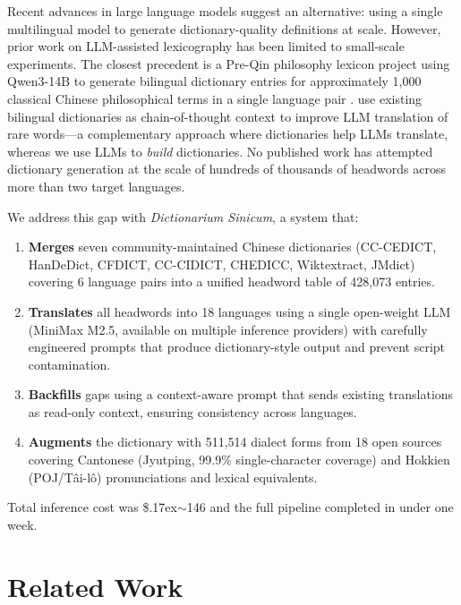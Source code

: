 \documentclass[11pt]{article}
\begin{document}
Recent advances in large language models suggest an alternative: using a single multilingual model to generate dictionary-quality definitions at scale. However, prior work on LLM-assisted lexicography has been limited to small-scale experiments. The closest precedent is a Pre-Qin philosophy lexicon project using Qwen3-14B to generate bilingual dictionary entries for approximately 1,000 classical Chinese philosophical terms in a single language pair \citep{wu2025preqin}. \citet{lu2024chainofdict} use existing bilingual dictionaries as chain-of-thought context to improve LLM translation of rare words---a complementary approach where dictionaries help LLMs translate, whereas we use LLMs to \textit{build} dictionaries. No published work has attempted dictionary generation at the scale of hundreds of thousands of headwords across more than two target languages.

We address this gap with \textit{Dictionarium Sinicum}, a system that:

\begin{enumerate}
\item \textbf{Merges} seven community-maintained Chinese dictionaries (CC-CEDICT, HanDeDict, CFDICT, CC-CIDICT, CHEDICC, Wiktextract, JMdict) covering 6 language pairs into a unified headword table of 428,073 entries.
\item \textbf{Translates} all headwords into 18 languages using a single open-weight LLM (MiniMax M2.5, available on multiple inference providers) with carefully engineered prompts that produce dictionary-style output and prevent script contamination.
\item \textbf{Backfills} gaps using a context-aware prompt that sends existing translations as read-only context, ensuring consistency across languages.
\item \textbf{Augments} the dictionary with 511,514 dialect forms from 18 open sources covering Cantonese (Jyutping, 99.9\% single-character coverage) and Hokkien (POJ/Tâi-lô) pronunciations and lexical equivalents.
\end{enumerate}

Total inference cost was \${\raise.17ex\hbox{$\scriptstyle\sim$}}146 and the full pipeline completed in under one week.


\section{Related Work}
\label{sec:related}
\end{document}
